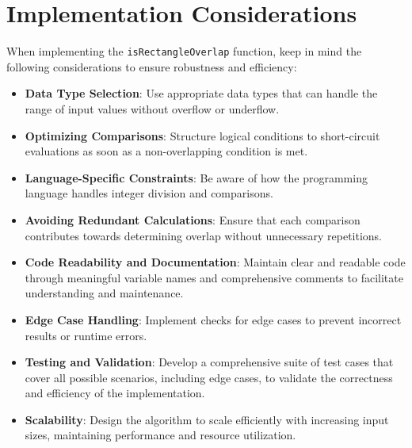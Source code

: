 \section*{Implementation Considerations}

When implementing the \texttt{isRectangleOverlap} function, keep in mind the following considerations to ensure robustness and efficiency:

\begin{itemize}
    \item \textbf{Data Type Selection}: Use appropriate data types that can handle the range of input values without overflow or underflow.
    
    \item \textbf{Optimizing Comparisons}: Structure logical conditions to short-circuit evaluations as soon as a non-overlapping condition is met.
    
    \item \textbf{Language-Specific Constraints}: Be aware of how the programming language handles integer division and comparisons.
    
    \item \textbf{Avoiding Redundant Calculations}: Ensure that each comparison contributes towards determining overlap without unnecessary repetitions.
    
    \item \textbf{Code Readability and Documentation}: Maintain clear and readable code through meaningful variable names and comprehensive comments to facilitate understanding and maintenance.
    
    \item \textbf{Edge Case Handling}: Implement checks for edge cases to prevent incorrect results or runtime errors.
    
    \item \textbf{Testing and Validation}: Develop a comprehensive suite of test cases that cover all possible scenarios, including edge cases, to validate the correctness and efficiency of the implementation.
    
    \item \textbf{Scalability}: Design the algorithm to scale efficiently with increasing input sizes, maintaining performance and resource utilization.
    

\end{itemize}
